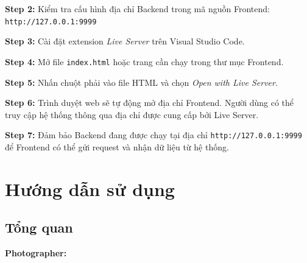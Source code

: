 \textbf{Step 2:} Kiểm tra cấu hình địa chỉ Backend trong mã nguồn Frontend:
\verb|http://127.0.0.1:9999|

\vspace{0.3cm}

\textbf{Step 3:} Cài đặt extension \textit{Live Server} trên Visual Studio Code.

\vspace{0.3cm}

\textbf{Step 4:} Mở file \texttt{index.html} hoặc trang cần chạy trong thư mục Frontend.

\vspace{0.3cm}

\textbf{Step 5:} Nhấn chuột phải vào file HTML và chọn
\textit{Open with Live Server}.

\vspace{0.3cm}

\textbf{Step 6:} Trình duyệt web sẽ tự động mở địa chỉ Frontend. Người dùng có thể truy cập hệ thống thông qua địa chỉ được cung cấp bởi Live Server.

\vspace{0.3cm}

\textbf{Step 7:} Đảm bảo Backend đang được chạy tại địa chỉ
\verb|http://127.0.0.1:9999|
để Frontend có thể gửi request và nhận dữ liệu từ hệ thống.

\section{Hướng dẫn sử dụng}
\subsection{Tổng quan}

\textbf{Photographer:}

